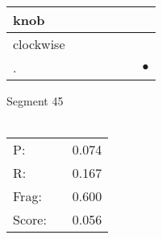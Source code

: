 \documentclass[landscape]{article}
\newcommand{\ssp}{\hspace{2pt}}
\newcommand{\mex}{\cellcolor{g}$\bullet$}
\begin{document}
\begin{tabular}{|l|p{10pt}|p{10pt}|p{10pt}|p{10pt}|p{10pt}|p{10pt}|}
\hline
\ssp knob \ssp&\hspace{2pt}&\hspace{2pt}&\hspace{2pt}&\hspace{2pt}&\hspace{2pt}&\hspace{2pt}\\
\hline
\ssp clockwise \ssp&\hspace{2pt}&\hspace{2pt}&\hspace{2pt}&\hspace{2pt}&\hspace{2pt}&\hspace{2pt}\\
\hline
\ssp \cellcolor{ref5}. \ssp&\hspace{2pt}&\hspace{2pt}&\hspace{2pt}&\hspace{2pt}&\hspace{2pt}&\hspace{2pt}\mex\\
\hline
\end{tabular}

\vspace{6pt}
\noindent Segment 45\\\\
\noindent\begin{tabular}{lm{12pt}r}
\hline
P:&&0.074\\
R:&&0.167\\
Frag:&&0.600\\
Score:&&0.056\\
\end{tabular}

\newpage
\end{document}

